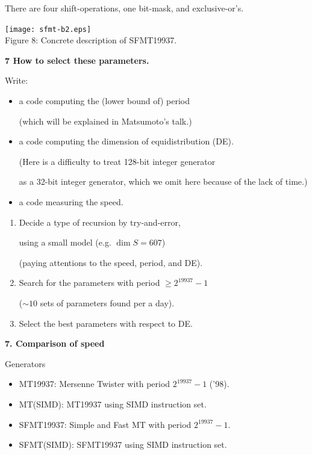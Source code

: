 \documentclass[a4j,12pt,landscape]{jarticle}
\begin{document}
There are four shift-operations, one bit-mask, and exclusive-or's.

\begin{center}
\texttt{[image: sfmt-b2.eps]}
\\
Figure 8: Concrete description of SFMT19937.
\end{center}

\newpage
{\bf 7 How to select these parameters.}

Write: 
\begin{itemize}
\item a code computing the (lower bound of) period

(which will be explained in Matsumoto's talk.)
\item  a code computing the dimension of equidistribution (DE).

(Here is a difficulty to treat 128-bit integer generator 

as a 32-bit integer generator,
which we omit here because of the lack of time.)
%

\item a code measuring the speed.
\end{itemize}

\newpage
\begin{enumerate}
\item 
Decide a type of recursion by try-and-error,

using a small model (e.g. $\dim S = 607$)

(paying attentions to the speed, period, and DE).
\item
Search for the parameters 
with period $\geq 2^{19937}-1$ 

($\sim 10$ sets of parameters found per a day).
\item
Select the best parameters with respect to DE.
\end{enumerate}

\newpage
\noindent
{\bf 7. Comparison of speed}
\begin{description}
  \item Generators
    \begin{itemize}
    \item MT19937: Mersenne Twister with period $2^{19937}-1$ ('98).
    \item MT(SIMD): MT19937 using SIMD instruction set.
    \item SFMT19937: Simple and Fast MT with period $2^{19937}-1$.
    \item SFMT(SIMD): SFMT19937 using SIMD instruction set.
    \end{itemize}
\end{description}
\end{document}
